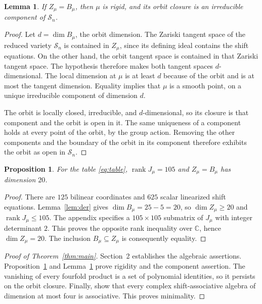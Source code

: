 \documentclass[11pt]{article}
\newtheorem{lemma}[theorem]{Lemma}
\newtheorem{proposition}[theorem]{Proposition}
\theoremstyle{remark}
\newcommand{\C}{\mathbb C}
\newcommand{\SAs}{\mathcal S}
\begin{document}
\begin{lemma}\label{lem:criterion}
If $Z_\mu=B_\mu$, then $\mu$ is rigid, and its orbit closure is an irreducible component of $\SAs_n$.
\end{lemma}
\begin{proof}
Let $d=\dim B_\mu$, the orbit dimension. The Zariski tangent space of the reduced variety $\SAs_n$ is contained in $Z_\mu$, since its defining ideal contains the shift equations. On the other hand, the orbit tangent space is contained in that Zariski tangent space. The hypothesis therefore makes both tangent spaces $d$-dimensional. The local dimension at $\mu$ is at least $d$ because of the orbit and is at most the tangent dimension. Equality implies that $\mu$ is a smooth point, on a unique irreducible component of dimension $d$.

The orbit is locally closed, irreducible, and $d$-dimensional, so its closure is that component and the orbit is open in it. The same uniqueness of a component holds at every point of the orbit, by the group action. Removing the other components and the boundary of the orbit in its component therefore exhibits the orbit as open in $\SAs_n$.
\end{proof}

\begin{proposition}\label{prop:rank}
For the table \eqref{eq:table}, $\operatorname{rank}J_\mu=105$ and $Z_\mu=B_\mu$ has dimension $20$.
\end{proposition}
\begin{proof}
There are $125$ bilinear coordinates and $625$ scalar linearized shift equations. Lemma~\ref{lem:der} gives $\dim B_\mu=25-5=20$, so $\dim Z_\mu\ge20$ and $\operatorname{rank}J_\mu\le105$. The appendix specifies a $105\times105$ submatrix of $J_\mu$ with integer determinant $2$. This proves the opposite rank inequality over $\C$, hence $\dim Z_\mu=20$. The inclusion $B_\mu\subseteq Z_\mu$ is consequently equality.
\end{proof}

\begin{proof}[Proof of Theorem~\ref{thm:main}]
Section~2 establishes the algebraic assertions. Proposition~\ref{prop:rank} and Lemma~\ref{lem:criterion} prove rigidity and the component assertion. The vanishing of every fourfold product is a set of polynomial identities, so it persists on the orbit closure. Finally, \cite[Corollary~58 and Proposition~59]{AKS} show that every complex shift-associative algebra of dimension at most four is associative. This proves minimality.
\end{proof}
\end{document}
